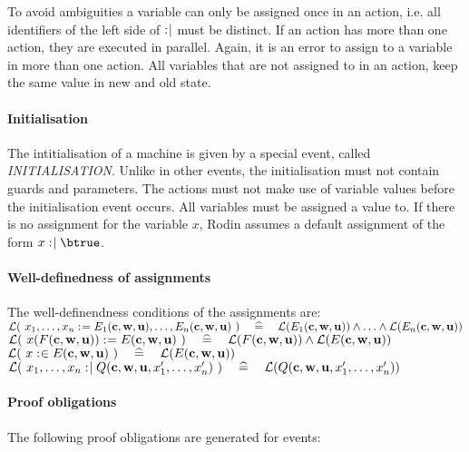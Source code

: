 To avoid ambiguities a variable can only be assigned once in an action, i.e. all identifiers 
  of the left side of $\mathrel{:\mkern1mu\mid}$ must be distinct.
If an action has more than one action, they are executed in parallel. Again, it is an error
  to assign to a variable in more than one action.
All variables that are not assigned to in an action, keep the same value in new and old state.

\paragraph{Initialisation}
The intitialisation of a machine is given by a special event, called \textsl{INITIALISATION}.
Unlike in other events, the initialisation must not contain guards and parameters.
The actions must not make use of variable values before the initialisation event occurs.
All variables must be assigned a value to. If there is no assignment for the variable $x$,
Rodin assumes a default assignment of the form $x\bcmsuch \btrue$.

\paragraph{Well-definedness of assignments}
The well-definendness conditions of the assignments are: \\
$\mathcal{L}(~x_1,\ldots,x_n \mathrel{:\mkern1mu=} E_1(\textbf{c},\textbf{w},\textbf{u}),\ldots,E_n(\textbf{c},\textbf{w},\textbf{u})~)
  \quad\mathrel{\widehat=}\quad 
  \mathcal{L}(E_1(\textbf{c},\textbf{w},\textbf{u})) \land \ldots \land \mathcal{L}(E_n(\textbf{c},\textbf{w},\textbf{u}))$ \\
$\mathcal{L}(~x(F(\textbf{c},\textbf{w},\textbf{u})) \mathrel{:\mkern1mu=} E(\textbf{c},\textbf{w},\textbf{u})~)
  \quad\mathrel{\widehat=}\quad 
  \mathcal{L}(F(\textbf{c},\textbf{w},\textbf{u})) \land \mathcal{L}(E(\textbf{c},\textbf{w},\textbf{u}))$ \\
$\mathcal{L}(~x \mathrel{:\mkern1mu\in} E(\textbf{c},\textbf{w},\textbf{u})~)
  \quad\mathrel{\widehat=}\quad
  \mathcal{L}(E(\textbf{c},\textbf{w},\textbf{u}))$\\
$\mathcal{L}(~x_1,\ldots,x_n \mathrel{:\mkern1mu\mid} Q(\textbf{c},\textbf{w},\textbf{u},x_1',\ldots,x_n')~)
  \quad\mathrel{\widehat=}\quad
  \mathcal{L}(Q(\textbf{c},\textbf{w},\textbf{u},x_1',\ldots,x_n'))$
\paragraph{Proof obligations}
The following proof obligations are generated for events:

